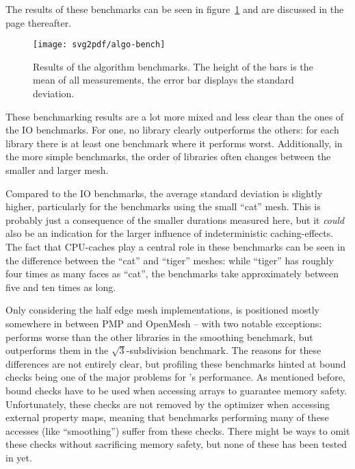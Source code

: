 The results of these benchmarks can be seen in figure~\ref{fig:algo-benchmark} and are discussed in the page thereafter.

\begin{figure}[p]
  \centering
  \centerline{
    \texttt{[image: svg2pdf/algo-bench]}
  }
  \vspace{1cm}
  \caption{
    Results of the algorithm benchmarks.
    The height of the bars is the mean of all measurements, the error bar displays the standard deviation.
  }
  \label{fig:algo-benchmark}
\end{figure}

\newpage

These benchmarking results are a lot more mixed and less clear than the ones of the IO benchmarks.
For one, no library clearly outperforms the others: for each library there is at least one benchmark where it performs worst.
Additionally, in the more simple benchmarks, the order of libraries often changes between the smaller and larger mesh.

Compared to the IO benchmarks, the average standard deviation is slightly higher, particularly for the benchmarks using the small \enquote{cat} mesh.
This is probably just a consequence of the smaller durations measured here, but it \emph{could} also be an indication for the larger influence of indeterministic caching-effects.
The fact that CPU-caches play a central role in these benchmarks can be seen in the difference between the \enquote{cat} and \enquote{tiger} meshes:
while \enquote{tiger} has roughly four times as many faces as \enquote{cat}, the benchmarks take approximately between five and ten times as long.

Only considering the half edge mesh implementations,  is positioned mostly somewhere in between PMP and OpenMesh -- with two notable exceptions:
 performs worse than the other libraries in the smoothing benchmark, but outperforms them in the $\sqrt{3}$-subdivision benchmark.
The reasons for these differences are not entirely clear, but profiling these benchmarks hinted at bound checks being one of the major problems for 's performance.
As mentioned before, bound checks have to be used when accessing arrays to guarantee memory safety.
Unfortunately, these checks are not removed by the optimizer when accessing external property maps, meaning that benchmarks performing many of these accesses (like \enquote{smoothing}) suffer from these checks.
There might be ways to omit these checks without sacrificing memory safety, but none of these has been tested in  yet.

